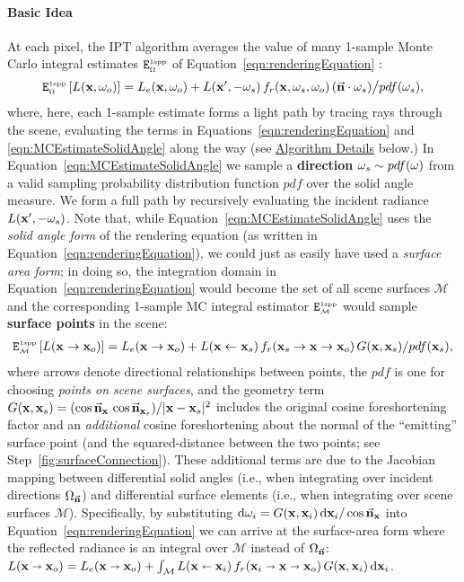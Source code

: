 \paragraph{Basic Idea}
%
At each pixel, the IPT algorithm averages the value of many 1-sample Monte Carlo integral estimates $\mathtt{E}^{\mbox{\tiny{1spp}}}_{\mbox{\tiny{$\Omega$}}}$ of Equation~\ref{eqn:renderingEquation} :
%
\begin{align}
\label{eqn:MCEstimateSolidAngle}
\mathtt{E}^{\mbox{\tiny{1spp}}}_{\mbox{\tiny{$\Omega$}}} \left[ L(\mathbf{x}, \mathbf{\omega}_o) \right] = L_e(\mathbf{x}, \mathbf{\omega}_o) + L(\mathbf{x}', -\mathbf{\omega}_{s}) \, f_r(\mathbf{x}, \mathbf{\omega}_{s}, \mathbf{\omega}_o) \, (\vec{\mathbf{n}} \cdot \mathbf{\omega}_{s})\big/pdf(\mathbf{\omega}_{s}),
\end{align}
%
where, here, each 1-sample estimate forms a light path by tracing rays through the scene, evaluating the terms in Equations~\ref{eqn:renderingEquation} and \ref{eqn:MCEstimateSolidAngle} along the way (see \hyperref[sec:IPTalgorithm]{Algorithm Details} below.) In Equation~\ref{eqn:MCEstimateSolidAngle} we sample a \textbf{direction} $\mathbf{\omega}_{s} \sim pdf(\omega)$ from a valid sampling probability distribution function $pdf$ over the solid angle measure. We form a full path by recursively evaluating the incident radiance $L(\mathbf{x}', -\mathbf{\omega}_{s})$. Note that, while Equation~\ref{eqn:MCEstimateSolidAngle} uses the \textit{solid angle form} of the rendering equation (as written in Equation~\ref{eqn:renderingEquation}), we could just as easily have used a \textit{surface area form}; in doing so, the integration domain in Equation~\ref{eqn:renderingEquation} would become the set of all scene surfaces $\mathcal{M}$ and the corresponding 1-sample MC integral estimator $\mathtt{E}^{\mbox{\tiny{1spp}}}_{\mbox{\tiny{$\mathcal{M}$}}}$ would sample \textbf{surface points} in the scene:
%
\begin{align}
\label{eqn:MCEstimateSurfaceArea}
\mathtt{E}^{\mbox{\tiny{1spp}}}_{\mbox{\tiny{$\mathcal{M}$}}} \left[ L(\mathbf{x} \rightarrow \mathbf{x}_o) \right] = L_e(\mathbf{x} \rightarrow \mathbf{x}_o) + L(\mathbf{x} \leftarrow \mathbf{x}_s) \, f_r(\mathbf{x}_s \rightarrow \mathbf{x} \rightarrow \mathbf{x}_o) \, G( \mathbf{x} , \mathbf{x}_s) \Large/ pdf(\mathbf{x}_s),
\end{align}
%
where arrows denote directional relationships between points, the $pdf$ is one for choosing \textit{points on scene surfaces}, and the geometry term $G( \mathbf{x} , \mathbf{x}_s) = (\cos\vec{\mathbf{n}}_{\mathbf{x}} \, \cos\vec{\mathbf{n}}_{\mathbf{x}_s}) / |\mathbf{x} - \mathbf{x}_s|^2$ includes the original cosine foreshortening factor and an \textit{additional} cosine foreshortening about the normal of the ``emitting'' surface point (and the squared-distance between the two points; see Step~\ref{fig:surfaceConnection}). These additional terms are due to the Jacobian mapping between differential solid angles (i.e., when integrating over incident directions $\Omega_{\vec{\mathbf{n}}}$) and differential surface elements (i.e., when integrating over scene surfaces $\mathcal{M}$). Specifically, by substituting $\mbox{d}\mathbf{\omega}_i = G( \mathbf{x} , \mathbf{x}_i) \, \mbox{d}\mathbf{x}_i / \cos\vec{\mathbf{n}}_{\mathbf{x}}$ into Equation~\ref{eqn:renderingEquation} we can arrive at the surface-area form where the reflected radiance is an integral over $\mathcal{M}$ instead of $\Omega_{\vec{\mathbf{n}}}$: $L(\mathbf{x} \shortrightarrow \mathbf{x}_o) =  L_e(\mathbf{x} \shortrightarrow \mathbf{x}_o) + \int_{\mathcal{M}} L(\mathbf{x} \shortleftarrow \mathbf{x}_i) \, f_r(\mathbf{x}_i \shortrightarrow \mathbf{x} \shortrightarrow \mathbf{x}_o) \, G( \mathbf{x} , \mathbf{x}_i) \, \mbox{d}\mathbf{x}_i$.

